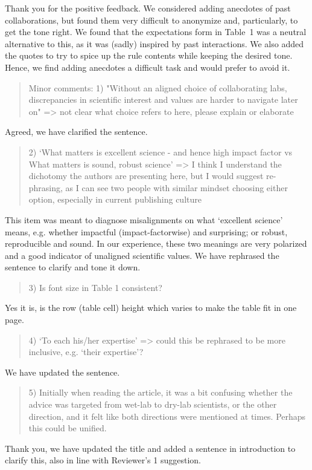 \documentclass[a4paper]{article}
\begin{document}
Thank you for the positive feedback. We considered adding anecdotes of past collaborations, but found them very difficult to anonymize and, particularly, to get the tone right. We found that the expectations form in Table~1 was a neutral alternative to this, as it was (sadly) inspired by past interactions. We also added the quotes to try to spice up the rule contents while keeping the desired tone. Hence, we find adding anecdotes a difficult task and would prefer to avoid it.


\begin{quote}
    
Minor comments:
1) "Without an aligned choice of collaborating labs, discrepancies in scientific interest and values are harder to navigate later on" => not clear what choice refers to here, please explain or elaborate
\end{quote}

Agreed, we have clarified the sentence.

\begin{quote}
    2) `What matters is excellent science - and hence high impact factor vs What matters is sound, robust science' => I think I understand the dichotomy the authors are presenting here, but I would suggest re-phrasing, as I can see two people with similar mindset choosing either option, especially in current publishing culture
\end{quote}

This item was meant to diagnose misalignments on what `excellent science' means, e.g. whether impactful (impact-factorwise) and surprising; or robust, reproducible and sound. In our experience, these two meanings are very polarized and a good indicator of unaligned scientific values. We have rephrased the sentence to clarify and tone it down.


\begin{quote}
    3) Is font size in Table 1 consistent?
\end{quote}

Yes it is, is the row (table cell) height which varies to make the table fit in one page.

\begin{quote}
    4) `To each his/her expertise' => could this be rephrased to be more inclusive, e.g. `their expertise'?
\end{quote}

We have updated the sentence.

\begin{quote}
5) Initially when reading the article, it was a bit confusing whether the advice was targeted from wet-lab to dry-lab scientists, or the other direction, and it felt like both directions were mentioned at times. Perhaps this could be unified.
\end{quote}

Thank you, we have updated the title and added a sentence in introduction to clarify this, also in line with Reviewer's 1 suggestion.
\end{document}
